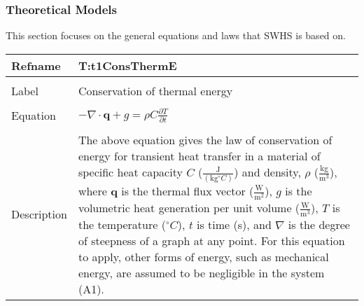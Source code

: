 \documentclass[12pt]{article}
\begin{document}
\subsubsection{Theoretical Models}
\label{Sec:TheoMode}
This section focuses on the general equations and laws that SWHS is based on.
~\newline
\noindent \begin{minipage}{\textwidth}
\begin{tabular}{p{} p{}}
\toprule \textbf{Refname} & \textbf{T:t1ConsThermE}
\label{T:t1ConsThermE}
\\ \midrule \\
Label & Conservation of thermal energy
\\ \midrule \\
Equation & $-\nabla{}\cdot{}\mathbf{q}+g=\rho{}C\frac{\partial{}T}{\partial{}t}$
\\ \midrule \\
Description & The above equation gives the law of conservation of energy for transient heat transfer in a material of specific heat capacity $C$ ($\frac{\text{J}}{(\text{kg}{}^{\circ}C)}$) and density, $\rho{}$ ($\frac{\text{kg}}{\text{m}^{3}}$), where $\mathbf{q}$ is the thermal flux vector ($\frac{\text{W}}{\text{m}^{2}}$), $g$ is the volumetric heat generation per unit volume ($\frac{\text{W}}{\text{m}^{3}}$), $T$ is the temperature (${}^{\circ}C$), $t$ is time (s), and $\nabla{}$ is the degree of steepness of a graph at any point. For this equation to apply, other forms of energy, such as mechanical energy, are assumed to be negligible in the system (A1).
\\ \bottomrule \end{tabular}
\end{minipage}\\
~\newline
\end{document}
